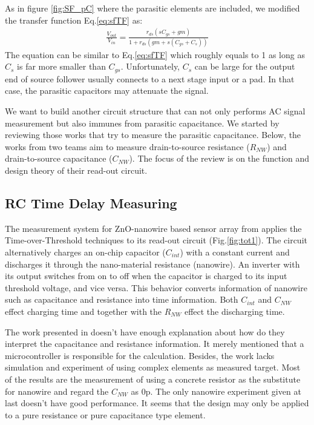 As in figure \ref{fig:SF_pC} where the parasitic elements are included, we modified the transfer function Eq.\ref{eq:sfTF} as:
\begin{align}
    \frac{V_{out}}{V_{in}} = \frac{r_{ds}(sC_{gs} + gm)}{1 + r_{ds}(gm + s(C_{gs}+C_s))}
\end{align}
The equation can be similar to Eq.\ref{eq:sfTF} which roughly equals to 1 as long as $C_s$ is far more smaller than $C_{gs}$.
Unfortunately, $C_s$ can be large for the output end of source follower usually connects to a next stage input or a pad.
In that case, the parasitic capacitors may attenuate the signal.

We want to build another circuit structure that can not only performs AC signal measurement but also immunes from parasitic capacitance.
We started by reviewing those works that try to measure the parasitic capacitance.
Below, the works from two teams aim to measure drain-to-source resistance ($R_{NW}$) and drain-to-source capacitance ($C_{NW}$).
The focus of the review is on the function and design theory of their read-out circuit.


\subsection{RC Time Delay Measuring}
The measurement system for ZnO-nanowire based sensor array from \cite{Juv1} applies the Time-over-Threshold techniques to its read-out circuit (Fig.\ref{fig:tot1}).
The circuit alternatively charges an on-chip capacitor ($C_{int}$) with a constant current and discharges it through the nano-material resistance (nanowire).
An inverter with its output switches from on to off when the capacitor is charged to its input threshold voltage, and vice versa.
This behavior converts information of nanowire such as capacitance and resistance into time information.
Both $C_{int}$ and $C_{NW}$ effect charging time and together with the $R_{NW}$ effect the discharging time.

The work presented in \cite{Juv1} doesn't have enough explanation about how do they interpret the capacitance and resistance information.
It merely mentioned that a microcontroller is responsible for the calculation.
Besides, the work lacks simulation and experiment of using complex elements as measured target.
Most of the results are the measurement of using a concrete resistor as the substitute for nanowire and regard the $C_{NW}$ as 0p.
The only nanowire experiment given at last doesn't have good performance.
It seems that the design may only be applied to a pure resistance or pure capacitance type element.

